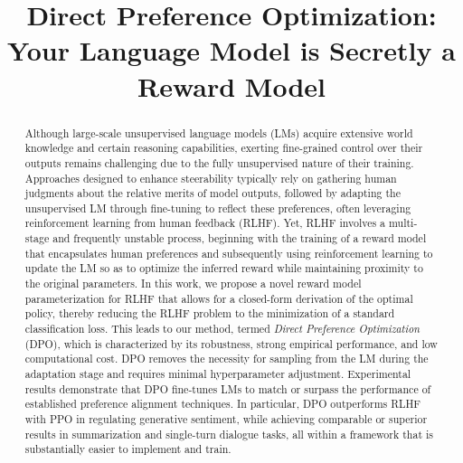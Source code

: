 \title{Direct Preference Optimization: Your Language Model is Secretly a Reward Model}

\begin{abstract}
Although large-scale unsupervised language models (LMs) acquire extensive world knowledge and certain reasoning capabilities, exerting fine-grained control over their outputs remains challenging due to the fully unsupervised nature of their training. Approaches designed to enhance steerability typically rely on gathering human judgments about the relative merits of model outputs, followed by adapting the unsupervised LM through fine-tuning to reflect these preferences, often leveraging reinforcement learning from human feedback (RLHF). Yet, RLHF involves a multi-stage and frequently unstable process, beginning with the training of a reward model that encapsulates human preferences and subsequently using reinforcement learning to update the LM so as to optimize the inferred reward while maintaining proximity to the original parameters. In this work, we propose a novel reward model parameterization for RLHF that allows for a closed-form derivation of the optimal policy, thereby reducing the RLHF problem to the minimization of a standard classification loss. This leads to our method, termed \textit{Direct Preference Optimization} (DPO), which is characterized by its robustness, strong empirical performance, and low computational cost. DPO removes the necessity for sampling from the LM during the adaptation stage and requires minimal hyperparameter adjustment. Experimental results demonstrate that DPO fine-tunes LMs to match or surpass the performance of established preference alignment techniques. In particular, DPO outperforms RLHF with PPO in regulating generative sentiment, while achieving comparable or superior results in summarization and single-turn dialogue tasks, all within a framework that is substantially easier to implement and train.
\end{abstract}

